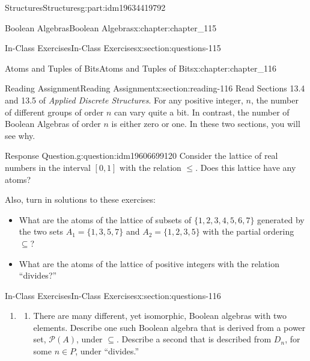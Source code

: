 \documentclass[oneside,10pt,]{book}
\numberwithin{equation}{section}
\begin{document}
\begin{partptx}{Structures}{}{Structures}{}{}{g:part:idm19634419792}
\begin{chapterptx}{Boolean Algebras}{}{Boolean Algebras}{}{}{x:chapter:chapter_115}
\begin{sectionptx}{In-Class Exercises}{}{In-Class Exercises}{}{}{x:section:questions-115}
\begin{enumerate}[label=\arabic*.]
%
\end{enumerate}
%
\end{sectionptx}
\end{chapterptx}
%
\typeout{************************************************}
\typeout{************************************************}
%
\begin{chapterptx}{Atoms and Tuples of Bits}{}{Atoms and Tuples of Bits}{}{}{x:chapter:chapter_116}
%
%
%
\typeout{************************************************}
\typeout{************************************************}
%
\begin{sectionptx}{Reading Assignment}{}{Reading Assignment}{}{}{x:section:reading-116}
Read Sections 13.4 and 13.5 of \emph{Applied Discrete Structures}. For any positive integer, \(n\), the number of different groups of order  \(n\) can vary quite a bit. In contrast, the number of Boolean Algebras of order  \(n\) is either zero or one. In these two sections, you will see why.%
\begin{question}{Response Question.}{g:question:idm19606699120}%
Consider the lattice of real numbers in the interval \([0,1]\) with the relation \(\leq\).  Does this lattice have any atoms?%
\end{question}
Also, turn in solutions to these exercises:%
\begin{itemize}[label=\textbullet]
\item{}What are the atoms of the lattice of subsets of \(\{1, 2, 3, 4, 5, 6, 7\}\)  generated by the two sets \(A_1=\{1,3,5,7\}\) and \(A_2=\{1,2,3,5\}\) with the partial ordering \(\subseteq\)?%
\item{}What are the atoms of the lattice of positive integers with the relation ``divides?''%
\end{itemize}
%
\end{sectionptx}
%
%
\typeout{************************************************}
\typeout{************************************************}
%
\begin{sectionptx}{In-Class Exercises}{}{In-Class Exercises}{}{}{x:section:questions-116}
%
\begin{enumerate}[label=\arabic*.]
\item{}%
\begin{enumerate}[label=(\alph*)]
\item{}There are many different, yet isomorphic, Boolean algebras with two elements. Describe one such Boolean algebra that is derived from a power set, \(\mathcal{P}(A)\), under \(\subseteq\). Describe a second that is described from \(D_n\), for some \(n \in  P\), under ``divides.''%

\end{enumerate}
\end{enumerate}
\end{sectionptx}
\end{chapterptx}
\end{partptx}
\end{document}
